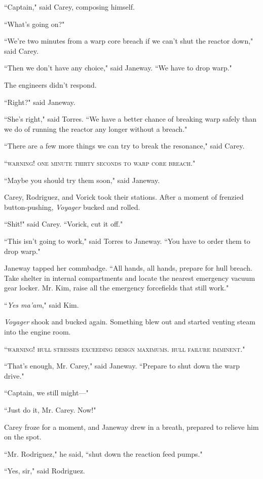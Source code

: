 \documentclass[twoside,letterpaper,12pt]{memoir}
\begin{document}
``Captain," said Carey, composing himself.

``What's going on?"

``We're two minutes from a warp core breach if we can't shut the reactor down," said Carey.

``Then we don't have any choice," said Janeway. ``We have to drop warp."

The engineers didn't respond.

``Right?" said Janeway.

``She's right," said Torres. ``We have a better chance of breaking warp safely than we do of running the reactor any longer without a breach."

``There are a few more things we can try to break the resonance," said Carey.

``\textsc{warning! one minute thirty seconds to warp core breach}."

``Maybe you should try them soon," said Janeway.

Carey, Rodriguez, and Vorick took their stations. After a moment of frenzied button-pushing, \textit{Voyager} bucked and rolled.

``Shit!" said Carey. ``Vorick, cut it off."

``This isn't going to work," said Torres to Janeway. ``You have to order them to drop warp."

Janeway tapped her commbadge. ``All hands, all hands, prepare for hull breach. Take shelter in internal compartments and locate the nearest emergency vacuum gear locker. Mr. Kim, raise all the emergency forcefields that still work."

``\textit{Yes ma'am}," said Kim.

\textit{Voyager} shook and bucked again. Something blew out and started venting steam into the engine room.

``\textsc{warning! hull stresses exceeding design maximums. hull failure imminent}."

``That's enough, Mr. Carey," said Janeway. ``Prepare to shut down the warp drive."

``Captain, we still might---"

``Just do it, Mr. Carey. Now!"

Carey froze for a moment, and Janeway drew in a breath, prepared to relieve him on the spot.

``Mr. Rodriguez," he said, ``shut down the reaction feed pumps."

``Yes, sir," said Rodriguez.
\end{document}
